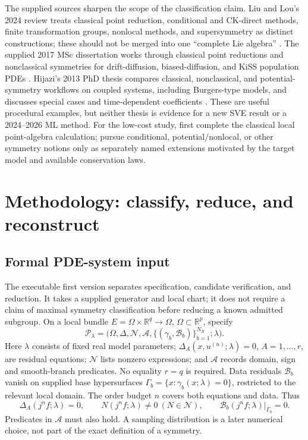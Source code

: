 \documentclass[11pt]{article}
\begin{document}
The supplied sources sharpen the scope of the classification claim. Liu and
Lou's 2024 review treats classical point reduction, conditional and CK-direct
methods, finite transformation groups, nonlocal methods, and supersymmetry as
distinct constructions; these should not be merged into one ``complete Lie
algebra'' \cite{liulou}. The supplied 2017 MSc dissertation works through
classical point reductions and nonclassical symmetries for drift-diffusion,
biased-diffusion, and KiSS population PDEs \cite{mathebula}. Hijazi's 2013 PhD
thesis compares classical, nonclassical, and potential-symmetry workflows on
coupled systems, including Burgers-type models, and discusses special cases
and time-dependent coefficients \cite{hijazi}. These are useful procedural
examples, but neither thesis is evidence for a new SVE result or a 2024--2026
ML method. For the low-cost study, first complete the classical local
point-algebra calculation; pursue conditional, potential/nonlocal, or other
symmetry notions only as separately named extensions motivated by the target
model and available conservation laws.

\section{Methodology: classify, reduce, and reconstruct}
\subsection{Formal PDE-system input}
The executable first version separates specification, candidate verification,
and reduction. It takes a supplied generator and local chart; it does not
require a claim of maximal symmetry classification before reducing a known
admitted subgroup. On a local bundle $E=\Omega\times\mathbb R^q\to\Omega$,
$\Omega\subset\mathbb R^p$, specify
\begin{equation}
\mathcal P_\lambda=
\bigl(\Omega,\Delta,\mathcal N,\mathcal A,
      \{(\gamma_b,\mathcal B_b)\}_{b=1}^{N_B};\lambda\bigr).
\label{eq:formal-problem}
\end{equation}
Here $\lambda$ consists of fixed real model parameters;
$\Delta_A(x,u^{(n)};\lambda)=0$, $A=1,\ldots,r$, are residual equations;
$\mathcal N$ lists nonzero expressions; and $\mathcal A$ records domain,
sign and smooth-branch predicates. No equality $r=q$ is required.
Data residuals $\mathcal B_b$ vanish on supplied base hypersurfaces
$\Gamma_b=\{x:\gamma_b(x;\lambda)=0\}$, restricted to the relevant local
domain. The order budget $n$ covers both equations and data. Thus
\begin{equation}
\Delta_A(j^nf;\lambda)=0,\qquad
N(j^nf;\lambda)\ne0\ (N\in\mathcal N),\qquad
\mathcal B_b(j^nf;\lambda)|_{\Gamma_b}=0.
\end{equation}
Predicates in $\mathcal A$ must also hold. A sampling distribution is a later
numerical choice, not part of the exact definition of a symmetry.
\end{document}
